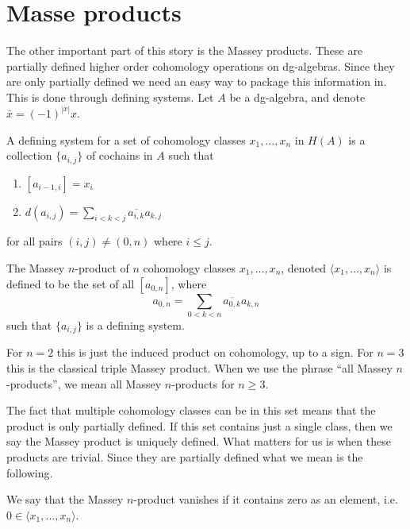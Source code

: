 

\section{Masse products}

The other important part of this story is the Massey products. These are partially defined 
higher order cohomology operations on dg-algebras. Since they are only partially defined 
we need an easy way to package this information in. This is done through defining systems. 
Let $A$ be a dg-algebra, and denote $\bar{x} = (-1)^{|x|}x$. 

\begin{definition}
    A defining system for a set of cohomology classes $x_1, \ldots, x_n$ 
    in $H(A)$ is a collection $\{ a_{i,j}\}$ of cochains in $A$ such that
    \begin{enumerate}
        \item $[a_{i-1, i}] = x_i$
        \item $d(a_{i, j}) = \sum_{i<k<j}\overline{a_{i, k}}a_{k, j}$
    \end{enumerate}
    for all pairs $(i,j)\neq (0,n)$ where $i\leq j$.
\end{definition}

\begin{definition}
    The Massey $n$-product of $n$ cohomology classes $x_1, \ldots, x_n$, 
    denoted $\langle x_1, \ldots, x_n\rangle$ is defined to be the set of all $[a_{0,n}]$, 
    where $$a_{0,n} = \sum_{0<k<n}\overline{a_{0, k}}a_{k, n}$$ such that $\{ a_{i,j} \}$ 
    is a defining system.         
\end{definition}

For $n=2$ this is just the induced product on cohomology, up to a sign. For $n=3$ this 
is the classical triple Massey product. When we use the phrase ``all Massey $n$-products'', 
we mean all Massey $n$-products for $n\geq 3$. 

The fact that multiple cohomology classes can be in this set means that the product is 
only partially defined. If this set contains just a single class, then we say the Massey 
product is uniquely defined. What matters for us is when these products are trivial. 
Since they are partially defined what we mean is the following.

\begin{definition}
    We say that the Massey $n$-product vanishes if it contains zero as an 
    element, i.e. $0\in \langle x_1, \ldots, x_n\rangle$.    
\end{definition}
